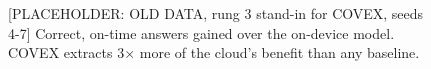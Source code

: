 \documentclass[sigconf]{acmart}
\begin{document}
{\selectfont
\begin{figure}[t]
  \centering
  
  \caption{{[}PLACEHOLDER: OLD DATA, rung 3 stand-in for COVEX, seeds 4-7] Correct, on-time answers gained over the on-device model. COVEX extracts 3$\times$ more of the cloud's benefit than any baseline.}
  \label{fig:F01_intro_teaser}
\end{figure}
}


\end{document}
